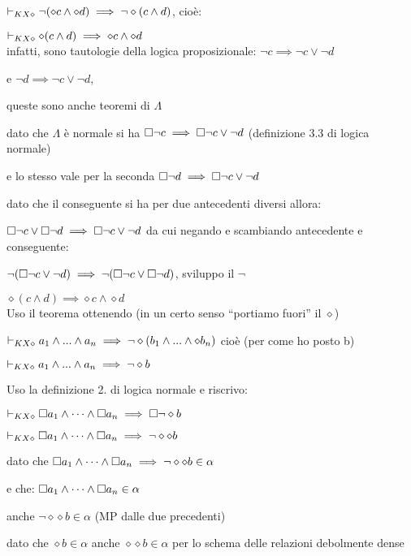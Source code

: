 $\vdash_{KX\diamond}\neg(\diamond c\wedge\diamond d)\implies\neg\diamond(c\wedge d)$,
cioè:

\textbf{$\vdash_{KX\diamond}\diamond(c\wedge d)\implies\diamond c\wedge\diamond d$}\\
infatti, sono tautologie della logica proposizionale: $\neg c\implies\neg c\vee\neg d$

e $\neg d\implies\neg c\vee\neg d$,

queste sono anche teoremi di $\Lambda$

dato che $\Lambda$ è normale si ha \foreignlanguage{english}{$\square\neg c\implies\square\neg c\vee\neg d$}
(definizione 3.3 di logica normale)

e lo stesso vale per la seconda $\square\neg d\implies\square\neg c\vee\neg d$

dato che il conseguente si ha per due antecedenti diversi allora:

%
$\square\neg c\vee\square\neg d\implies\square\neg c\vee\neg d$\foreignlanguage{italian}{
da cui negando e scambiando antecedente e conseguente:}

%
$\neg(\square\neg c\vee\neg d)\implies\neg(\square\neg c\vee\square\neg d)$,
sviluppo il $\neg$

$\diamond(c\wedge d)\implies\diamond c\wedge\diamond d$\\


Uso il teorema ottenendo (in un certo senso ``portiamo fuori'' il
$\diamond$)

%
$\vdash_{KX\diamond}a_{1}\wedge...\wedge a_{n}\implies\neg\diamond(b_{1}\wedge...\wedge\diamond b_{n})$\foreignlanguage{italian}{
cioè (per come ho posto b)}

%
$\vdash_{KX\diamond}a_{1}\wedge...\wedge a_{n}\implies\neg\diamond b$ 

Uso la definizione 2. di logica normale e riscrivo:

$\vdash_{KX\diamond}\square a_{1}\wedge\dots\wedge\square a_{n}\implies\square\neg\diamond b$

$\vdash_{KX\diamond}\square a_{1}\wedge\dots\wedge\square a_{n}\implies\neg\diamond\diamond b$

dato che $\square a_{1}\wedge\dots\wedge\square a_{n}\implies\neg\diamond\diamond b\in\alpha$ 

e che: $\square a_{1}\wedge\dots\wedge\square a_{n}\in\alpha$

anche $\neg\diamond\diamond b\in\alpha$ (MP dalle due precedenti)

dato che $\diamond b\in\alpha$ anche $\diamond\diamond b\in\alpha$
per lo schema delle relazioni debolmente dense

